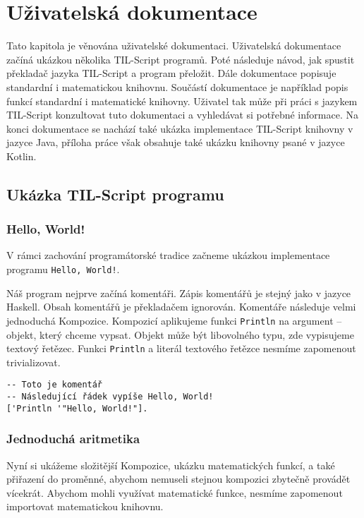 \chapter{Uživatelská dokumentace}

Tato kapitola je věnována uživatelské dokumentaci. Uživatelská dokumentace začíná ukázkou několika
TIL-Script programů. Poté následuje návod, jak spustit překladač jazyka TIL-Script a program
přeložit. Dále dokumentace popisuje standardní i matematickou knihovnu. Součástí dokumentace je
například popis funkcí standardní i matematické knihovny. Uživatel tak může při práci s jazykem
TIL-Script konzultovat tuto dokumentaci a vyhledávat si potřebné informace. Na konci dokumentace
se nachází také ukázka implementace TIL-Script knihovny v jazyce Java, příloha práce však obsahuje
také ukázku knihovny psané v jazyce Kotlin.

\section{Ukázka TIL-Script programu}

\subsection{Hello, World!}

V rámci zachování programátorské tradice začneme ukázkou implementace programu
\lstinline{Hello, World!}.

Náš program nejprve začíná komentáři. Zápis komentářů je stejný jako v jazyce Haskell. Obsah
komentářů je překladačem ignorován. Komentáře následuje velmi jednoduchá Kompozice. Kompozicí
aplikujeme funkci \lstinline{Println} na argument -- objekt, který chceme vypsat. Objekt může být
libovolného typu, zde vypisujeme textový řetězec. Funkci \lstinline{Println} a literál textového
řetězce nesmíme zapomenout trivializovat.

\begin{lstlisting}[caption={Program Hello, World! v jazyce TIL-Script}]
-- Toto je komentář
-- Následující řádek vypíše Hello, World!
['Println '"Hello, World!"].
\end{lstlisting}

\subsection{Jednoduchá aritmetika}

Nyní si ukážeme složitější Kompozice, ukázku matematických funkcí, a také přiřazení do proměnné,
abychom nemuseli stejnou kompozici zbytečně provádět vícekrát. Abychom mohli využívat matematické
funkce, nesmíme zapomenout importovat matematickou knihovnu.

